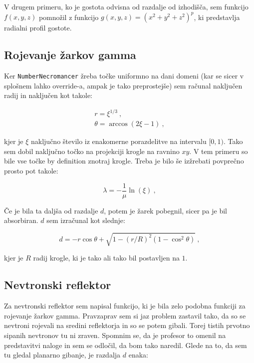 \documentclass[a4paper]{article}
\begin{document}
V drugem primeru, ko je gostota odvisna od razdalje od izhodišča, sem funkcijo $f(x,y,z)$ pomnožil z funkcijo 
$g(x,y,z) = (x^2 + y^2 + z^2)^p$, ki predstavlja radialni profil gostote.

\subsection{Rojevanje žarkov gamma}
Ker \texttt{NumberNecromancer} žreba točke uniformno na dani domeni (kar se sicer v splošnem lahko override-a, ampak je tako 
preprostejše) sem računal naključen radij in naključen kot takole:

\begin{gather}
    r = \xi^{1/3}\>, \\
    \theta = \arccos(2 \xi - 1)\>,
\end{gather}

kjer je $\xi$ naključno število iz enakomerne porazdelitve na intervalu $[0,1)$. Tako sem dobil naključno točko na projekciji 
krogle na ravnino $xy$. V tem primeru so bile vse točke by definition znotraj krogle. Treba je bilo še izžrebati povprečno prosto
pot takole:

\begin{equation}
    \lambda = -\frac{1}{\mu} \ln(\xi)\>,
\end{equation}

Če je bila ta daljša od razdalje $d$, potem je žarek pobegnil, sicer pa je bil absorbiran. $d$ sem izračunal kot slednje:

\begin{equation}
    d = -r \cos\theta + \sqrt{1 - ({r}/{R})^2(1-\cos^2\theta)}\>,
\end{equation}

kjer je $R$ radij krogle, ki je tako ali tako bil postavljen na $1$. \\

\subsection{Nevtronski reflektor}
Za nevtronski reflektor sem napisal funkcijo, ki je bila zelo podobna funkciji za rojevanje žarkov gamma. Pravzaprav sem si jaz problem 
zastavil tako, da so se nevtroni rojevali na sredini reflektorja in so se potem gibali. Torej tistih prvotno sipanih nevtronov tu ni zraven.
Spomnim se, da je profesor to omenil na predstavitvi naloge in sem se odločil, da bom tako naredil. Glede na to, da sem tu gledal planarno 
gibanje, je razdalja $d$ enaka:
\end{document}
